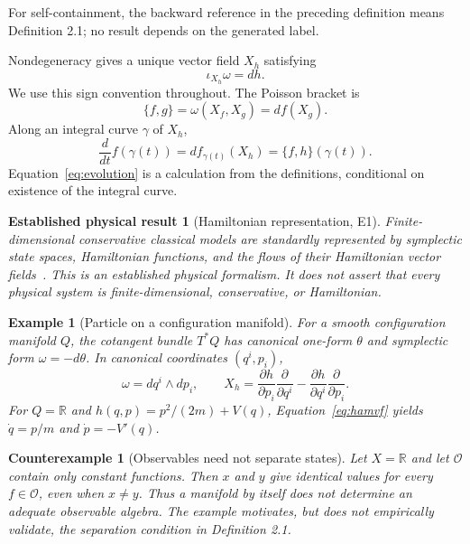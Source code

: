 \documentclass[11pt]{article}
\newtheorem{established}[definition]{Established physical result}
\newtheorem{counterexample}[definition]{Counterexample}
\newtheorem{example}[definition]{Example}
\newcommand{\R}{\mathbb{R}}
\newcommand{\Obs}{\mathcal{O}}
\begin{document}
For self-containment, the backward reference in the preceding definition means Definition 2.1; no result depends on the generated label.

Nondegeneracy gives a unique vector field $X_h$ satisfying
\begin{equation}\label{eq:hamvf}
 \iota_{X_h}\omega=dh.
\end{equation}
We use this sign convention throughout. The Poisson bracket is
\begin{equation}\label{eq:poisson}
 \{f,g\}=\omega(X_f,X_g)=df(X_g).
\end{equation}
Along an integral curve $\gamma$ of $X_h$,
\begin{equation}\label{eq:evolution}
 \frac{d}{dt}f(\gamma(t))=df_{\gamma(t)}(X_h)=\{f,h\}(\gamma(t)).
\end{equation}
Equation~\eqref{eq:evolution} is a calculation from the definitions, conditional on existence of the integral curve.

\begin{established}[Hamiltonian representation, E1]
Finite-dimensional conservative classical models are standardly represented by symplectic state spaces, Hamiltonian functions, and the flows of their Hamiltonian vector fields~\cite[Chs.~3,6]{MarsdenRatiu1999}. This is an established physical formalism. It does not assert that every physical system is finite-dimensional, conservative, or Hamiltonian.
\end{established}

\begin{example}[Particle on a configuration manifold]
For a smooth configuration manifold $Q$, the cotangent bundle $T^*Q$ has canonical one-form $\theta$ and symplectic form $\omega=-d\theta$. In canonical coordinates $(q^i,p_i)$,
\[
 \omega=dq^i\wedge dp_i,
 \qquad
 X_h=\frac{\partial h}{\partial p_i}\frac{\partial}{\partial q^i}
      -\frac{\partial h}{\partial q^i}\frac{\partial}{\partial p_i}.
\]
For $Q=\R$ and $h(q,p)=p^2/(2m)+V(q)$, Equation~\eqref{eq:hamvf} yields $\dot q=p/m$ and $\dot p=-V'(q)$.
\end{example}

\begin{counterexample}[Observables need not separate states]
Let $X=\R$ and let $\Obs$ contain only constant functions. Then $x$ and $y$ give identical values for every $f\in\Obs$, even when $x\ne y$. Thus a manifold by itself does not determine an adequate observable algebra. The example motivates, but does not empirically validate, the separation condition in Definition 2.1.
\end{counterexample}
\end{document}

